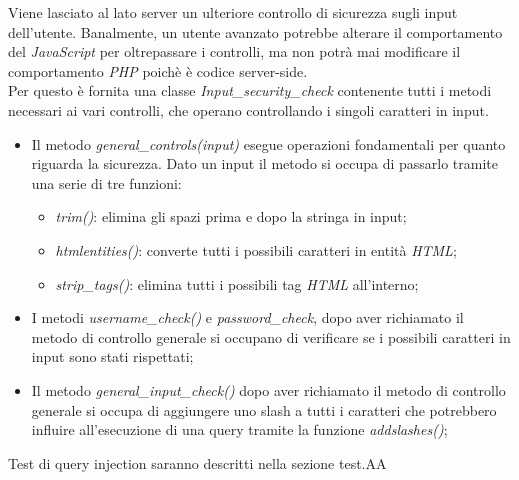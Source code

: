 Viene lasciato al lato server un ulteriore controllo di sicurezza sugli input dell'utente. Banalmente, un utente avanzato potrebbe alterare il comportamento
del \emph{JavaScript} per oltrepassare i controlli, ma non potrà mai modificare il comportamento \emph{PHP} poichè è codice server-side.\\
Per questo è fornita una classe \emph{Input\_security\_check} contenente tutti i metodi necessari ai vari controlli, che operano controllando i singoli caratteri in input.
\begin{itemize}
    \item Il metodo \emph{general\_controls(input)} esegue operazioni fondamentali per quanto riguarda la sicurezza. Dato un input il metodo si occupa di passarlo tramite una serie di tre funzioni: 
    \begin{itemize}
        \item \emph{trim()}: elimina gli spazi prima e dopo la stringa in input;
        \item \emph{htmlentities()}: converte tutti i possibili caratteri in entità \emph{HTML};
        \item \emph{strip\_tags()}: elimina tutti i possibili tag \emph{HTML} all'interno;
    \end{itemize}
    \item I metodi \emph{username\_check()} e \emph{password\_check}, dopo aver richiamato il metodo di controllo generale si occupano di verificare se i possibili caratteri in input sono stati rispettati;
    \item Il metodo \emph{general\_input\_check()} dopo aver richiamato il metodo di controllo generale si occupa di aggiungere uno slash a tutti i caratteri che potrebbero influire all'esecuzione di una query tramite la funzione \emph{addslashes()};
\end{itemize}

Test di query injection saranno descritti nella sezione test.AA